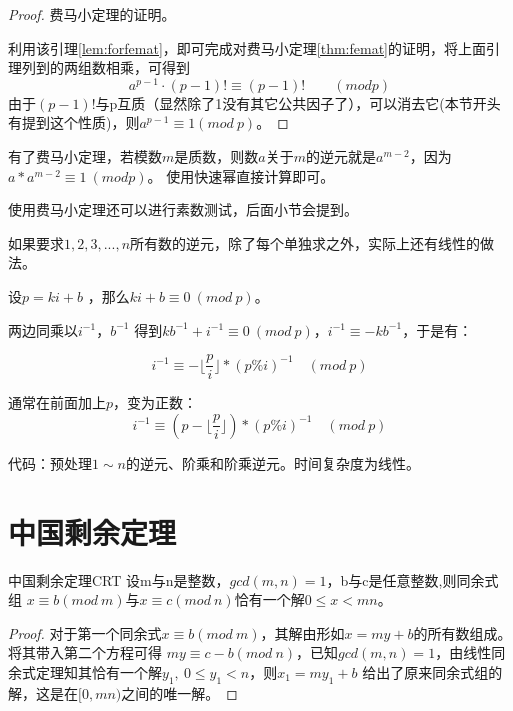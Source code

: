 \begin{proof}
	费马小定理的证明。
	
	利用该引理\ref{lem:forfemat}，即可完成对费马小定理\ref{thm:femat}的证明，将上面引理列到的两组数相乘，可得到
	$$
	a^{p-1} \cdot (p-1)!\equiv (p-1)!   \qquad (modp)
	$$
	由于$(p-1)!$与p互质（显然除了1没有其它公共因子了），可以消去它(本节开头有提到这个性质)，则$a^{p-1}\equiv 1(mod\ p)$。
\end{proof}

\vbox{}

有了费马小定理，若模数$m$是质数，则数$a$关于$m$的逆元就是$a^{m-2}$，因为$a* a^{m-2} \equiv 1 \ (mod p)$。
使用快速幂直接计算即可。

\vbox{}

{\heiti 使用费马小定理还可以进行素数测试}，后面小节会提到。

\vbox{}

\begin{note}
	如果要求$1,2,3,...,n$所有数的逆元，除了每个单独求之外，实际上还有线性的做法。
	
	设$p=ki+b$ ，那么$ki+b\equiv 0 \ (mod\  p)$。 
	
	两边同乘以$i^{-1}，b^{-1}$ 得到$kb^{-1}+i^{-1}\equiv 0 \  (mod\ p)$，$i^{-1}\equiv -kb^{-1}$，于是有：
	
	$$i^{-1}\equiv -\lfloor\frac{p}{i}\rfloor * (p\%i)^{-1} \quad (mod\ p)$$
	
	通常在前面加上$p$，变为正数：
	$$i^{-1}\equiv (p-\lfloor\frac{p}{i}\rfloor) * (p\%i)^{-1} \quad (mod\ p)$$
	
	代码：预处理$1\sim n$的逆元、阶乘和阶乘逆元。时间复杂度为线性。
	
\end{note}

\section{中国剩余定理}

\begin{theorem}{中国剩余定理}{CRT}
	设m与n是整数，$gcd(m,n)=1$，b与c是任意整数,则同余式组
	$x\equiv b(mod\ m)$与$x\equiv c(mod\ n)$恰有一个解$0\leqslant x<mn$。
\end{theorem}

\begin{proof}
	对于第一个同余式$x\equiv b(mod\ m)$，其解由形如$x = my +b$的所有数组成。将其带入第二个方程可得
	$my\equiv c-b (mod\ n)$，已知$gcd(m,n)=1$，由线性同余式定理知其恰有一个解$y_1,\ 0\le y_1<n$，则$x_1=my_1+b$
	给出了原来同余式组的解，这是在$[0,mn)$之间的唯一解。
\end{proof}

